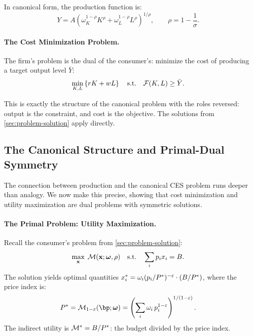 In canonical form, the production function is:
\begin{equation}
Y = A \left( \omega_K^{1-\rho} K^\rho + \omega_L^{1-\rho} L^\rho \right)^{1/\rho}, \qquad \rho = 1 - \frac{1}{\sigma}.
\label{eq:ces-canonical}
\end{equation}

\paragraph{The Cost Minimization Problem.}
The firm's problem is the dual of the consumer's: minimize the cost of producing a target output level $\bar{Y}$:
\begin{equation}
\min_{K, L} \left\{ rK + wL \right\} \quad \text{s.t.} \quad \mathcal{F}(K, L) \geq \bar{Y}.
\label{eq:cost-min}
\end{equation}

This is exactly the structure of the canonical problem with the roles reversed: output is the constraint, and cost is the objective. The solutions from \cref{sec:problem-solution} apply directly.

\subsection{The Canonical Structure and Primal-Dual Symmetry}
\label{subsec:canonical-production}

The connection between production and the canonical CES problem runs deeper than analogy. We now make this precise, showing that cost minimization and utility maximization are dual problems with symmetric solutions.

\paragraph{The Primal Problem: Utility Maximization.}
Recall the consumer's problem from \cref{sec:problem-solution}:
\begin{equation}
\max_{\mathbf{x}} \; \mathcal{M}(\mathbf{x}; \boldsymbol{\omega}, \rho) \quad \text{s.t.} \quad \sum_i p_i x_i = B.
\label{eq:primal-utility}
\end{equation}
The solution yields optimal quantities $x_i^* = \omega_i (p_i / P^{*})^{-\varepsilon} \cdot (B / P^{*})$, where the price index is:
\begin{equation}
\Pstar = \M_{1-\varepsilon}(\bp; \bom) = \left( \sum_i \omega_i \, p_i^{1-\varepsilon} \right)^{1/(1-\varepsilon)}.
\label{eq:price-index-recall}
\end{equation}
The indirect utility is $\mathcal{M}^* = B / P^{*}$: the budget divided by the price index.

